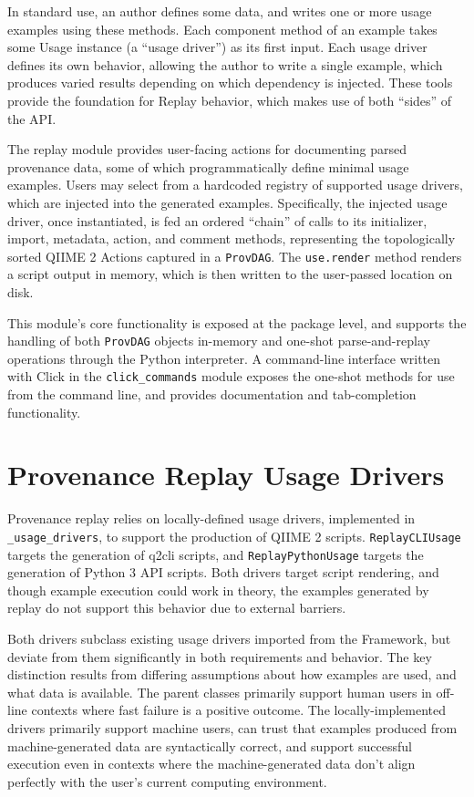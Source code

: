 In standard use, an author defines some data, and writes one or more usage
examples using these methods. Each component method of an example takes some
Usage instance (a “usage driver”) as its first input. Each usage driver defines
its own behavior, allowing the author to write a single example, which produces
varied results depending on which dependency is injected. These tools provide
the foundation for Replay behavior, which makes use of both “sides” of the API. 

The replay module provides user-facing actions for documenting parsed provenance
data, some of which programmatically define minimal usage examples. Users may
select from a hardcoded registry of supported usage drivers, which are injected
into the generated examples. Specifically, the injected usage driver, once
instantiated, is fed an ordered “chain” of calls to its initializer, import,
metadata, action, and comment methods, representing the topologically sorted
QIIME 2 Actions captured in a \texttt{ProvDAG}. The \texttt{use.render} method renders a script
output in memory, which is then written to the user-passed location on disk.

This module’s core functionality is exposed at the package level, and supports
the handling of both \texttt{ProvDAG} objects in-memory and one-shot parse-and-replay
operations through the Python interpreter. A command-line interface written with
Click \parencite{pallets_click_2014} in the \texttt{click\_commands} module exposes the
one-shot methods for use from the command line, and provides documentation and
tab-completion functionality.


\section{Provenance Replay Usage Drivers}

Provenance replay relies on locally-defined usage drivers, implemented in
\texttt{\_usage\_drivers}, to support the production of QIIME 2 scripts. \texttt{ReplayCLIUsage}
targets the generation of q2cli scripts, and \texttt{ReplayPythonUsage} targets the
generation of Python 3 API scripts. Both drivers target script rendering, and though
example execution could work in theory, the examples generated by replay do not
support this behavior due to external barriers.

Both drivers subclass existing usage drivers imported from the Framework, but
deviate from them significantly in both requirements and behavior. The key
distinction results from differing assumptions about how examples are used, and
what data is available. The parent classes primarily support human users in
off-line contexts where fast failure is a positive outcome. The
locally-implemented drivers primarily support machine users, can trust that
examples produced from machine-generated data are syntactically correct, and
support successful execution even in contexts where the machine-generated data
don’t align perfectly with the user’s current computing environment. 

